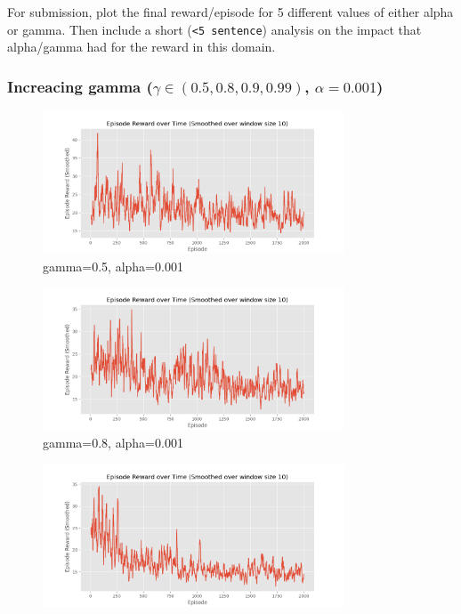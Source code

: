 \documentclass[a4paper]{article}
\theoremstyle{definition}
\newenvironment{soln}{
    \leavevmode\color{blue}\ignorespaces
}{}
\begin{document}
\begin{enumerate}
	      For submission, plot the final reward/episode for 5 different values of either alpha or gamma. Then include a short (\verb|<5 sentence|) analysis on the impact that alpha/gamma had for the reward in this domain.

	      \begin{soln}
		      \subsubsection*{Increacing gamma ($\gamma \in (0.5, 0.8, 0.9, 0.99)$, $\alpha = 0.001$)}
		      \begin{figure}[H]
			      \centering
			      \includegraphics[width=0.8\textwidth]{img/0.5g0.001a.png}
			      \caption*{gamma=0.5, alpha=0.001}
		      \end{figure}
		      \begin{figure}[H]
			      \centering
			      \includegraphics[width=0.8\textwidth]{img/0.8g0.001a.png}
			      \caption*{gamma=0.8, alpha=0.001}
		      \end{figure}
		      \begin{figure}[H]
			      \centering
			      \includegraphics[width=0.8\textwidth]{img/0.9g0.001a.png}

\end{figure}
\end{soln}
\end{enumerate}
\end{document}
